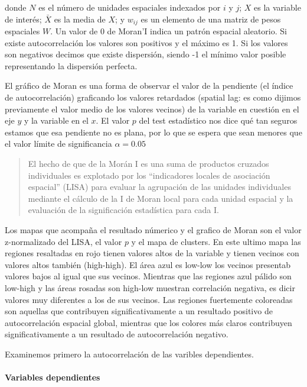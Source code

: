 \documentclass[12pt,]{book}
\let\oldparagraph\paragraph
\renewcommand{\paragraph}[1]{\oldparagraph{#1}\mbox{}}
\begin{document}
donde \(N\) es el número de unidades espaciales indexados por \(i\) y
\(j\); \(X\) es la variable de interés; \(\bar {X}\) es la media de
\(X\); y \(w_{ij}\) es un elemento de una matriz de pesos espaciales
\(W\). Un valor de 0 de Moran'I indica un patrón espacial aleatorio. Si
existe autocorrelación los valores son positivos y el máximo es 1. Si
los valores son negativos decimos que existe dispersión, siendo -1 el
mínimo valor posible representando la dispersión perfecta.

El gráfico de Moran es una forma de observar el valor de la pendiente
(el índice de autocorrelación) graficando los valores retardados
(spatial lag: es como dijimos previamente el valor medio de los valores
vecinos) de la variable en cuestión en el eje \(y\) y la variable en el
\(x\). El valor \textbf{\(p\)} del test estadístico nos dice qué tan
seguros estamos que esa pendiente no es plana, por lo que se espera que
sean menores que el valor límite de significancia \(\alpha = 0.05\)

\begin{quote}
El hecho de que de la Morán I es una suma de productos cruzados
individuales es explotado por los ``indicadores locales de asociación
espacial'' (LISA) para evaluar la agrupación de las unidades
individuales mediante el cálculo de la I de Moran local para cada unidad
espacial y la evaluación de la significación estadística para cada I.
\citep{wikilisa}
\end{quote}

Los mapas que acompaña el resultado númerico y el grafico de Moran son
el valor z-normalizado del LISA, el valor \(p\) y el mapa de clusters.
En este ultimo mapa las regiones resaltadas en rojo tienen valores altos
de la variable y tienen vecinos con valores altos también (high-high).
El área azul es low-low los vecinos presentab valores bajos al igual que
sus vecinos. Mientras que las regiones azul pálido son low-high y las
áreas rosadas son high-low muestran correlación negativa, es dicir
valores muy diferentes a los de sus vecinos. Las regiones fuertemente
coloreadas son aquellas que contribuyen significativamente a un
resultado positivo de autocorrelación espacial global, mientras que los
colores más claros contribuyen significativamente a un resultado de
autocorrelación negativo.

Examinemos primero la autocorrelación de las varibles dependientes.

\paragraph{Variables dependientes}\label{variables-dependientes}
\end{document}
